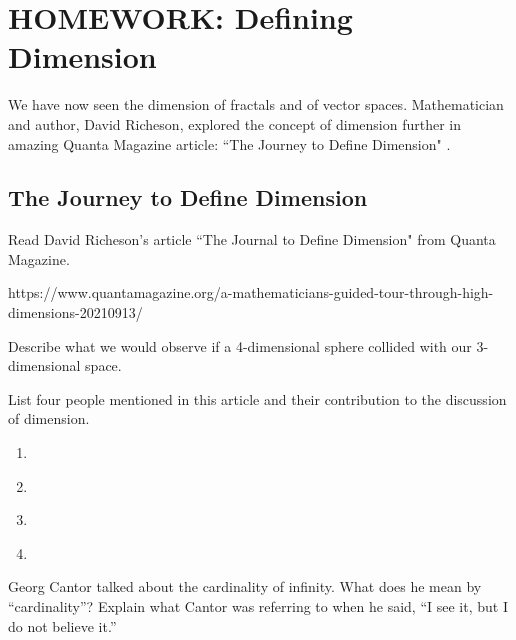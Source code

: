 
\section{HOMEWORK: Defining Dimension}

We have now seen the dimension of fractals and of vector spaces. Mathematician and author, David Richeson, explored the concept of dimension further in amazing Quanta Magazine article: ``The Journey to Define Dimension" \cite{richeson}.


\subsection{The Journey to Define Dimension}

\begin{exercise}
Read David Richeson’s article ``The Journal to Define Dimension" from Quanta Magazine. 
\end{exercise}
{\footnotesize https://www.quantamagazine.org/a-mathematicians-guided-tour-through-high-dimensions-20210913/ }

\begin{exercise}
Describe what we would observe if a 4-dimensional sphere collided with our 3-dimensional space.
\end{exercise}

\blanks
\blanks

\begin{exercise}
List four people mentioned in this article and their contribution to the discussion of dimension.
\end{exercise}

\begin{enumerate}
    \item \hspace{1in} \\
    \item \hspace{1in} \\
    \item \hspace{1in} \\
    \item
\end{enumerate}

\begin{exercise}
Georg Cantor talked about the cardinality of infinity. What does he mean by ``cardinality”? Explain what Cantor was referring to when he said, ``I see it, but I do not believe it.”
\end{exercise}

